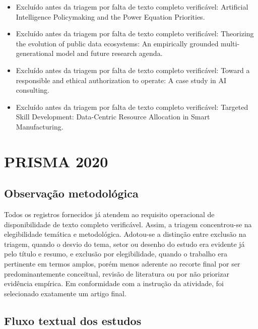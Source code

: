 \documentclass[12pt,a4paper]{article}
\begin{document}
\begin{itemize}
\item Excluído antes da triagem por falta de texto completo verificável: Artificial Intelligence Policymaking and the Power Equation Priorities.
\item Excluído antes da triagem por falta de texto completo verificável: Theorizing the evolution of public data ecosystems: An empirically grounded multi-generational model and future research agenda.
\item Excluído antes da triagem por falta de texto completo verificável: Toward a responsible and ethical authorization to operate: A case study in AI consulting.
\item Excluído antes da triagem por falta de texto completo verificável: Targeted Skill Development: Data-Centric Resource Allocation in Smart Manufacturing.
\end{itemize}

\section{PRISMA 2020}
\label{sec:orgc4c21d5}

\subsection{Observação metodológica}
\label{sec:org497abd0}

Todos os registros fornecidos já atendem ao requisito operacional de disponibilidade de texto completo verificável. Assim, a triagem concentrou-se na elegibilidade temática e metodológica. Adotou-se a distinção entre exclusão na triagem, quando o desvio do tema, setor ou desenho do estudo era evidente já pelo título e resumo, e exclusão por elegibilidade, quando o trabalho era pertinente em termos amplos, porém menos aderente ao recorte final por ser predominantemente conceitual, revisão de literatura ou por não priorizar evidência empírica. Em conformidade com a instrução da atividade, foi selecionado exatamente um artigo final.

\subsection{Fluxo textual dos estudos}
\label{sec:orgf47c2ab}
\end{document}
